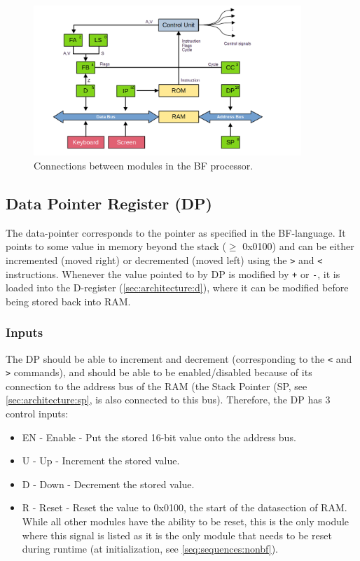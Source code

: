 \begin{figure}[H]
  \centering
  \includegraphics[width=0.9\textwidth]{img/bfcpu_architecture}
  \caption{Connections between modules in the BF processor.}
  \label{fig:architecture}
\end{figure}


\subsection{Data Pointer Register (DP)} \label{sec:architecture:dp}
The data-pointer corresponds to the pointer as specified in the BF-language. It points to some value in memory beyond the stack ($\ge$ 0x0100) and can be either incremented (moved right) or decremented (moved left) using the \texttt{>} and \texttt{<} instructions. Whenever the value pointed to by DP is modified by \texttt{+} or \texttt{-}, it is loaded into the D-register (\ref{sec:architecture:d}), where it can be modified before being stored back into RAM.

\subsubsection*{Inputs}
The DP should be able to increment and decrement (corresponding to the \texttt{<} and \texttt{>} commands), and should be able to be enabled/disabled because of its connection to the address bus of the RAM (the Stack Pointer (SP, see \ref{sec:architecture:sp}, is also connected to this bus). Therefore, the DP has 3 control inputs:
\begin{itemize}
\itemsep0em 
\item EN - Enable - Put the stored 16-bit value onto the address bus.
\item U - Up - Increment the stored value.
\item D - Down - Decrement the stored value.
\item R - Reset - Reset the value to 0x0100, the start of the datasection of RAM. While all other modules have the ability to be reset, this is the only module where this signal is listed as it is the only module that needs to be reset during runtime (at initialization, see \ref{seq:sequences:nonbf}).
\end{itemize}

